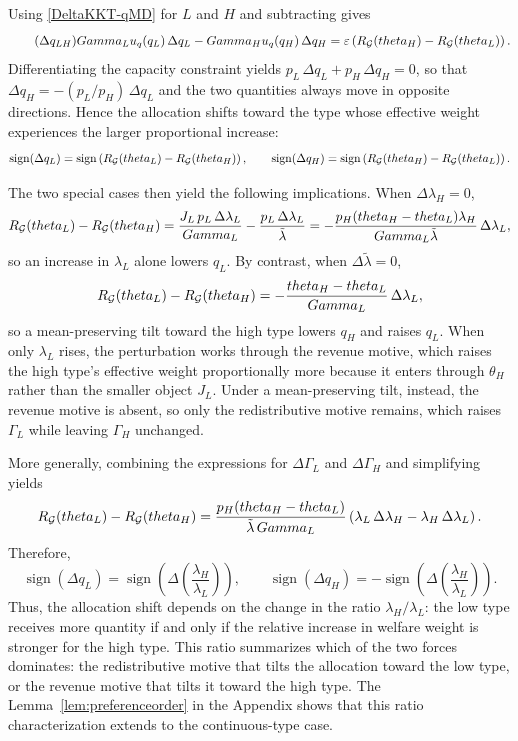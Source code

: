 \documentclass{class}
\begin{document}
Using \ref{DeltaKKT-qMD} for $L$ and $H$ and subtracting gives
\[\tag{$\Delta q_{LH}$}\label{DeltaqLH}
\Gamma_L u_q(q_L)\,\Delta q_L - \Gamma_H u_q(q_H)\,\Delta q_H
=
\varepsilon\left(R_\G(\theta_H)-R_\G(\theta_L)\right).
\]
Differentiating the capacity constraint yields $p_L\,\Delta q_L + p_H\,\Delta q_H = 0$, so that $\Delta q_H = -(p_L/p_H)\,\Delta q_L$ and the two quantities always move in opposite directions. Hence the allocation shifts toward the type whose effective weight experiences the larger proportional increase:
\[
\operatorname{sign}(\Delta q_L)
=
\operatorname{sign}\left(R_{\mathcal{G}}(theta_L)-R_{\mathcal{G}}(theta_H)\right),
\qquad
\operatorname{sign}(\Delta q_H)
=
\operatorname{sign}\left(R_{\mathcal{G}}(theta_H)-R_{\mathcal{G}}(theta_L)\right).
\]

The two special cases then yield the following implications. When $\Delta\lambda_H=0$,
\[
R_{\mathcal{G}}(theta_L) - R_{\mathcal{G}}(theta_H)
=
\frac{J_L\,p_L\,\Delta\lambda_L}{Gamma_L}
-
\frac{p_L\,\Delta\lambda_L}{\tilde\lambda} = 
-\frac{p_H(theta_H-theta_L)\lambda_H}{Gamma_L\tilde\lambda}\,\Delta\lambda_L,
\]
so an increase in $\lambda_L$ alone lowers $q_L$. By contrast, when $\Delta\tilde\lambda=0$,
\[
R_{\mathcal{G}}(theta_L) - R_{\mathcal{G}}(theta_H)
=
-\frac{theta_H-theta_L}{Gamma_L}\,\Delta\lambda_L,
\]
so a mean-preserving tilt toward the high type lowers $q_H$ and raises $q_L$. When only $\lambda_L$ rises, the perturbation works through the revenue motive, which raises the high type's effective weight proportionally more because it enters through $\theta_H$ rather than the smaller object $J_L$. Under a mean-preserving tilt, instead, the revenue motive is absent, so only the redistributive motive remains, which raises $\Gamma_L$ while leaving $\Gamma_H$ unchanged.

More generally, combining the expressions for $\Delta\Gamma_L$ and $\Delta\Gamma_H$ and simplifying yields
\[
R_{\mathcal{G}}(theta_L)-R_{\mathcal{G}}(theta_H)
=
\frac{p_H(theta_H-theta_L)}{\tilde\lambda\,Gamma_L}
\left(\lambda_L\,\Delta\lambda_H-\lambda_H\,\Delta\lambda_L\right).
\]
Therefore,
\[
\operatorname{sign}(\Delta q_L)
=
\operatorname{sign}\left(\Delta\left(\frac{\lambda_H}{\lambda_L}\right)\right),
\qquad
\operatorname{sign}(\Delta q_H)
=
-\operatorname{sign}\left(\Delta\left(\frac{\lambda_H}{\lambda_L}\right)\right).
\]
Thus, the allocation shift depends on the change in the ratio $\lambda_H/\lambda_L$: the low type receives more quantity if and only if the relative increase in welfare weight is stronger for the high type. This ratio summarizes which of the two forces dominates: the redistributive motive that tilts the allocation toward the low type, or the revenue motive that tilts it toward the high type. The Lemma~\ref{lem:preferenceorder} in the Appendix shows that this ratio characterization extends to the continuous-type case.
\end{document}
